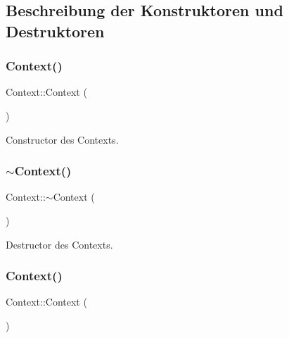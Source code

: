\subsection{Beschreibung der Konstruktoren und Destruktoren}
\hypertarget{class_context_a652cdcd2eedc8dbd9110bd284c5d5cf0}{}\label{class_context_a652cdcd2eedc8dbd9110bd284c5d5cf0} 
\subsubsection{\texorpdfstring{Context()}{Context()}\hspace{0.1cm}{\footnotesize\ttfamily [1/2]}}
{\footnotesize\ttfamily Context\+::\+Context (\begin{DoxyParamCaption}{ }\end{DoxyParamCaption})}

Constructor des Contexts. \hypertarget{class_context_a2d34e4556448e40693f61d15e091b604}{}\label{class_context_a2d34e4556448e40693f61d15e091b604} 
\subsubsection{\texorpdfstring{$\sim$\+Context()}{~Context()}\hspace{0.1cm}{\footnotesize\ttfamily [1/2]}}
{\footnotesize\ttfamily Context\+::$\sim$\+Context (\begin{DoxyParamCaption}{ }\end{DoxyParamCaption})\hspace{0.3cm}{\ttfamily [virtual]}}

Destructor des Contexts. \hypertarget{class_context_a652cdcd2eedc8dbd9110bd284c5d5cf0}{}\label{class_context_a652cdcd2eedc8dbd9110bd284c5d5cf0} 
\subsubsection{\texorpdfstring{Context()}{Context()}\hspace{0.1cm}{\footnotesize\ttfamily [2/2]}}
{\footnotesize\ttfamily Context\+::\+Context (\begin{DoxyParamCaption}{ }\end{DoxyParamCaption})}

\hypertarget{class_context_a8be937c21e267c8d55decced9d1bcf90}{}\label{class_context_a8be937c21e267c8d55decced9d1bcf90} 
